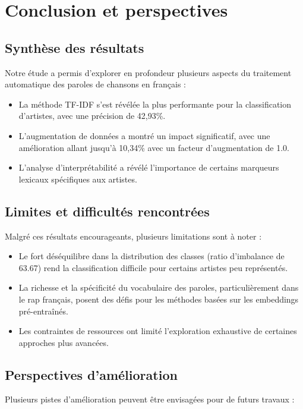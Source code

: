 \documentclass[a4paper,11pt]{article}
\begin{document}
\section{Conclusion et perspectives}
\label{sec:conclusion}

\subsection{Synthèse des résultats}
Notre étude a permis d'explorer en profondeur plusieurs aspects du traitement automatique des paroles de chansons en français :

\begin{itemize}
    \item La méthode TF-IDF s'est révélée la plus performante pour la classification d'artistes, avec une précision de 42,93\%.
    \item L'augmentation de données a montré un impact significatif, avec une amélioration allant jusqu'à 10,34\% avec un facteur d'augmentation de 1.0.
    \item L'analyse d'interprétabilité a révélé l'importance de certains marqueurs lexicaux spécifiques aux artistes.
\end{itemize}

\subsection{Limites et difficultés rencontrées}
Malgré ces résultats encourageants, plusieurs limitations sont à noter :

\begin{itemize}
    \item Le fort déséquilibre dans la distribution des classes (ratio d'imbalance de 63.67) rend la classification difficile pour certains artistes peu représentés.
    \item La richesse et la spécificité du vocabulaire des paroles, particulièrement dans le rap français, posent des défis pour les méthodes basées sur les embeddings pré-entraînés.
    \item Les contraintes de ressources ont limité l'exploration exhaustive de certaines approches plus avancées.
\end{itemize}

\subsection{Perspectives d'amélioration}
Plusieurs pistes d'amélioration peuvent être envisagées pour de futurs travaux :
\end{document}
